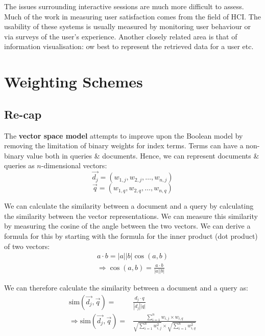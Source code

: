 \documentclass[a4paper,11pt]{article}
\begin{document}
The issues surrounding interactive sessions are much more difficult to assess.
Much of the work in measuring user satisfaction comes from the field of HCI.
The usability of these systems is usually measured by monitoring user behaviour or via surveys of the user's 
experience.
Another closely related area is that of information visualisation: ow best to represent the retrieved data for a
user etc.

\section{Weighting Schemes}
\subsection{Re-cap}
The \textbf{vector space model} attempts to improve upon the Boolean model by removing the limitation of binary weights for index terms.
Terms can have a non-binary value both in queries \& documents.
Hence, we can represent documents \& queries as $n$-dimensional vectors:
$$
\vec{d_j} = \left( w_{1,j} , w_{2,j} , \dots , w_{n,j} \right)
$$
$$
\vec{q} = \left( w_{1,q} , w_{2,q} , \dots , w_{n,q} \right)
$$

We can calculate the similarity between a document and a query by calculating the similarity between the vector representations.
We can measure this similarity by measuring the cosine of the angle between the two vectors.
We can derive a formula for this by starting with the formula for the inner product (dot product) of two vectors:
\begin{align}
a \cdot b = |a| |b| \cos(a,b) \\
\Rightarrow
\cos(a,b) = \frac{a \cdot b}{|a| |b|}
\end{align}

We can therefore calculate the similarity between a document and a query as:
\begin{align*}
    \text{sim}(\vec{d_j}, \vec{q}) = &\frac{d_j \cdot q}{|d_j| |q|} \\
\Rightarrow
    \text{sim}(\vec{d_j}, \vec{q}) = &\frac{\sum^n_{i=1} w_{i,j} \times w_{i,q}}{\sqrt{\sum^n_{i=1} w_{i,j}^2} \times \sqrt{\sum^n_{i=1} w_{i,q}^2}}
\end{align*}
\end{document}
